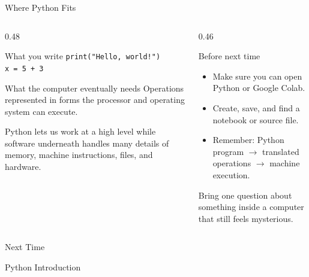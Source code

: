 \documentclass[aspectratio=169,10pt]{beamer}
\begin{document}
\begin{frame}[shrink=10]{Where Python Fits}
  \begin{columns}[T,onlytextwidth]
    \begin{column}{0.48\textwidth}
      \begin{block}{What you write}
        \texttt{print("Hello, world!")}\\
        \texttt{x = 5 + 3}
      \end{block}
      \begin{block}{What the computer eventually needs}
        Operations represented in forms the processor and operating system can execute.
      \end{block}
      \begin{keyidea}
        Python lets us work at a high level while software underneath handles many details of memory, machine instructions, files, and hardware.
      \end{keyidea}
    \end{column}
    \begin{column}{0.46\textwidth}
      \begin{block}{Before next time}
        \begin{itemize}
          \item Make sure you can open Python or Google Colab.
          \item Create, save, and find a notebook or source file.
          \item Remember: Python program $\rightarrow$ translated operations $\rightarrow$ machine execution.
        \end{itemize}
      \end{block}
      \begin{activity}
        Bring one question about something inside a computer that still feels mysterious.
      \end{activity}
    \end{column}
  \end{columns}
\end{frame}

\begin{frame}{Next Time}
  \begin{center}
    {\Huge Python Introduction}
  \end{center}
\end{frame}
\end{document}
